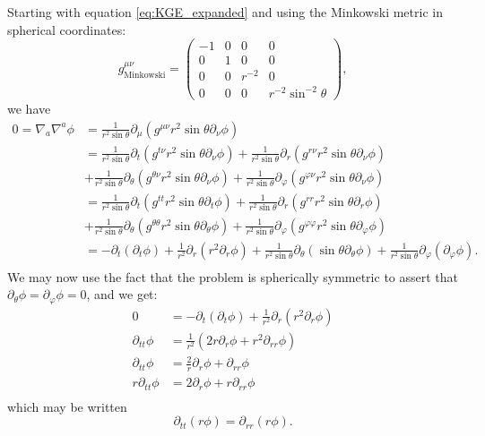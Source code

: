 \documentclass[12pt]{article}
\numberwithin{equation}{section}
\begin{document}
Starting with equation \ref{eq:KGE_expanded} and using the Minkowski metric in spherical coordinates:
\begin{equation}
g^{\mu \nu}_{\mathrm{Minkowski}} = 
\begin{pmatrix}
-1 & 0 & 0 & 0 \\
0 & 1 & 0 & 0 \\
0 & 0 & r^{-2} & 0 \\
0 & 0 & 0 & r^{-2} \sin^{-2} \theta
\end{pmatrix},
\end{equation}
we have
\begin{equation}
\begin{aligned}
0 = \nabla_a \nabla^a \phi &= \frac{1}{r^2 \sin \theta} \partial_\mu (g^{\mu \nu} r^2 \sin \theta \partial_\nu \phi) \\
&= \frac{1}{r^2 \sin \theta} \partial_t (g^{t \nu} r^2 \sin \theta \partial_\nu \phi) + \frac{1}{r^2 \sin \theta} \partial_r (g^{r \nu} r^2 \sin \theta \partial_\nu \phi) \\
&+ \frac{1}{r^2 \sin \theta} \partial_\theta (g^{\theta \nu} r^2 \sin \theta \partial_\nu \phi) + \frac{1}{r^2 \sin \theta} \partial_\varphi (g^{\varphi \nu} r^2 \sin \theta \partial_\nu \phi) \\
&= \frac{1}{r^2 \sin \theta} \partial_t (g^{t t} r^2 \sin \theta \partial_t \phi) + \frac{1}{r^2 \sin \theta} \partial_r (g^{r r} r^2 \sin \theta \partial_r \phi) \\
&+ \frac{1}{r^2 \sin \theta} \partial_\theta (g^{\theta \theta} r^2 \sin \theta \partial_\theta \phi) + \frac{1}{r^2 \sin \theta} \partial_\varphi (g^{\varphi \varphi} r^2 \sin \theta \partial_\varphi \phi) \\
&= - \partial_t (\partial_t \phi) + \frac{1}{r^2} \partial_r (r^2 \partial_r \phi) + \frac{1}{r^2 \sin \theta} \partial_\theta (\sin \theta \partial_\theta \phi) + \frac{1}{r^2 \sin \theta} \partial_\varphi (\partial_\varphi \phi). \\
\end{aligned}
\end{equation}
We may now use the fact that the problem is spherically symmetric to assert that $\partial_\theta \phi = \partial_\varphi \phi = 0$, and we get:
\begin{equation*}
\begin{aligned}
0 &= - \partial_t (\partial_t \phi) + \frac{1}{r^2} \partial_r (r^2 \partial_r \phi) \\
\partial_{tt} \phi &= \frac{1}{r^2} (2 r \partial_r \phi + r^2 \partial_{rr} \phi) \\
\partial_{tt} \phi &= \frac{2}{r} \partial_r \phi + \partial_{rr} \phi \\
r \partial_{tt} \phi &= 2 \partial_r \phi + r \partial_{rr} \phi \\
\end{aligned}
\end{equation*}
which may be written
\begin{equation}
\partial_{tt} (r \phi) = \partial_{rr} (r \phi).
\end{equation}
\end{document}
